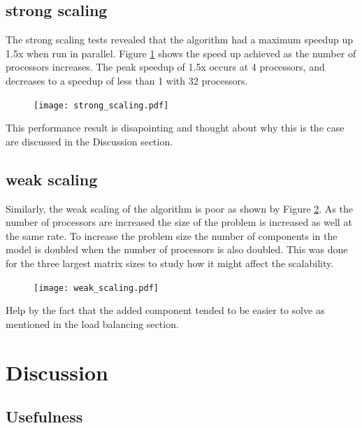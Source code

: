 \documentclass[conf]{new-aiaa}
\begin{document}
\subsection{strong scaling}
The strong scaling tests revealed that the algorithm had a maximum speedup up 1.5x when run in parallel.
Figure \ref{fig:speedup} shows the speed up achieved as the number of processors increases.
The peak speedup of 1.5x occurs at 4 processors, and decreases to a speedup of less than 1 with 32 processors.

\begin{figure}[H]
	\centering
	\texttt{[image: strong\_scaling.pdf]}
	\caption{}
	\label{fig:speedup}
\end{figure}

This performance result is disapointing and thought about why this is the case are discussed in the Discussion section.



\subsection{weak scaling}

Similarly, the weak scaling of the algorithm is poor as shown by Figure \ref{fig:weak_scaling}.
As the number of processors are increased the size of the problem is increased as well at the same rate.
To increase the problem size the number of components in the model is doubled when the number of processors is also doubled.
This was done for the three largest matrix sizes to study how it might affect the scalability.


\begin{figure}[H]
	\centering
	\texttt{[image: weak\_scaling.pdf]}
	\caption{}
	\label{fig:weak_scaling}
\end{figure}

Help by the fact that the added component tended to be easier to solve as mentioned in the load balancing section.



\section{Discussion}

\subsection{Usefulness}
\end{document}
